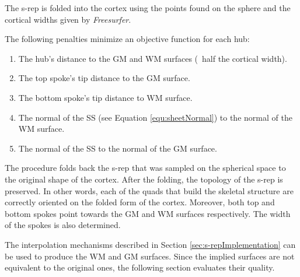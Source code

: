 The s-rep is folded into the cortex
using the points found on the sphere and
the cortical widths given by \textit{Freesurfer}. 

The following penalties minimize an objective function for each hub:

\begin{enumerate}
 \item The hub's distance to the GM and WM surfaces (~half the cortical width).
 \item The top spoke's tip distance to the GM surface.
 \item The bottom spoke's tip distance to WM surface.
 \item The normal of the SS (see Equation \ref{equ:sheetNormal}) to the normal of the WM surface.
 \item The normal of the SS to the normal of the GM surface.
\end{enumerate}



The procedure folds back the s-rep that was sampled on the spherical space to the original shape of the cortex. 
After the folding, the topology of the s-rep is preserved. 
In other words, each of the quads that build the skeletal structure 
are correctly oriented on the folded form of the cortex. 
Moreover, both top and bottom spokes point towards the GM and WM surfaces respectively. The width of the
spokes is also determined.

The interpolation mechanisms described in Section \ref{sec:s-repImplementation} can 
be used to produce the WM and GM surfaces. 
Since the implied surfaces are not equivalent to the original ones, the following section evaluates 
their quality. 

